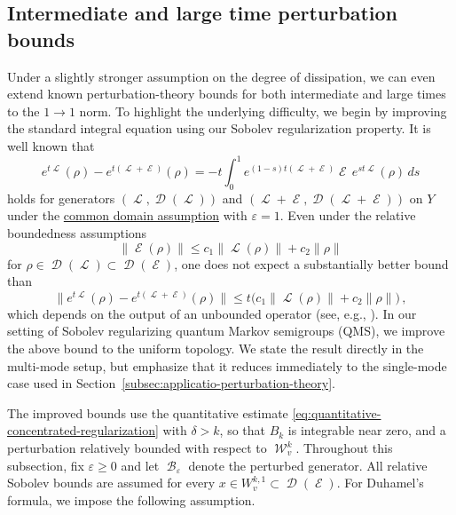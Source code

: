 \documentclass[11pt]{article}
\theoremstyle{myplain}
\theoremstyle{mydefinition}
\theoremstyle{remark}
\DeclareMathOperator{\cB}{\mathcal{B}}
\DeclareMathOperator{\cD}{\mathcal{D}}
\DeclareMathOperator{\cE}{\mathcal{E}}
\DeclareMathOperator{\cL}{\mathcal{L}}
\DeclareMathOperator{\cW}{\mathcal{W}}
\DeclareMathOperator{\1}{\mathds{1}}
\begin{document}
    \subsection{Intermediate and large time perturbation bounds}\label{subsec:perturbation-theory}
        Under a slightly stronger assumption on the degree of dissipation, we can even extend known perturbation-theory bounds for both intermediate and large times to the $1 \rightarrow 1$ norm. To highlight the underlying difficulty, we begin by improving the standard integral equation using our Sobolev regularization property. It is well known that
        \begin{equation*}
            e^{t\cL}(\rho) - e^{t(\cL+\cE)}(\rho) = -t\int_0^1 e^{(1-s)t(\cL+\cE)}\cE\, e^{s t\cL}(\rho)\, ds
        \end{equation*}
        holds for generators $(\cL, \cD(\cL))$ and $(\cL+\cE, \cD(\cL+\cE))$ on $Y$ under the \hyperref[assum:perturbation-common-domain]{common domain assumption} with $\varepsilon = 1$. Even under the relative boundedness assumptions
        \begin{equation*}
            \|\cE(\rho)\|\leq c_1\|\cL(\rho)\|+c_2\|\rho\|
        \end{equation*}
        for $\rho\in\cD(\cL)\subset\cD(\cE)$, one does not expect a substantially better bound than
        \begin{equation*}
            \|e^{t\cL}(\rho) - e^{t(\cL+\cE)}(\rho)\| \leq t \bigl( c_1\|\cL(\rho)\| + c_2\|\rho\| \bigr)\,,
        \end{equation*}
        which depends on the output of an unbounded operator (see, e.g., \cite[Chap.~9]{Kato.1995}). In our setting of Sobolev regularizing quantum Markov semigroups (QMS), we improve the above bound to the uniform topology. We state the result directly in the multi-mode setup, but emphasize that it reduces immediately to the single-mode case used in Section~\ref{subsec:applicatio-perturbation-theory}.

        The improved bounds use the quantitative estimate \eqref{eq:quantitative-concentrated-regularization} with $\delta>k$, so that $B_k$ is integrable near zero, and a perturbation relatively bounded with respect to $\cW^{k}_v$. Throughout this subsection, fix $\varepsilon\geq0$ and let $\cB_\varepsilon$ denote the perturbed generator. All relative Sobolev bounds are assumed for every $x\in W_v^{k,1}\subset\cD(\cE)$. For Duhamel's formula, we impose the following assumption.
\end{document}
